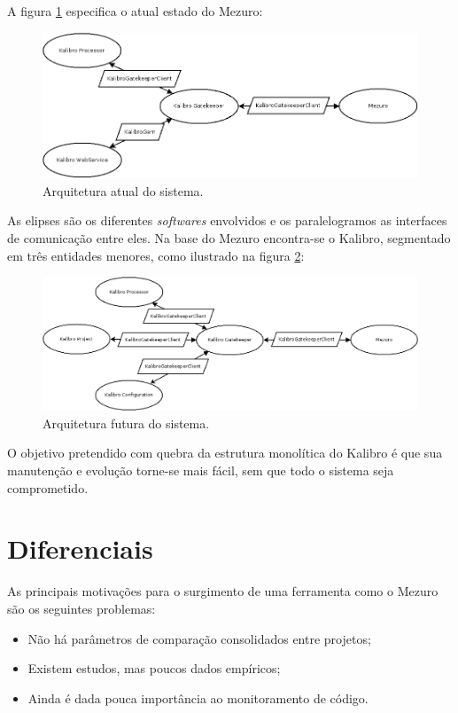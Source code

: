 \documentclass{llncs}
\begin{document}
A figura \ref{fig:architecture-1} especifica o atual estado do Mezuro:
\begin{figure}[H]
  \centering
  \includegraphics[width=\textwidth]{images/mezuro-architecture-actual.png}
  \caption{Arquitetura atual do sistema.}
  \label{fig:architecture-1}
\end{figure}
As elipses são os diferentes \textit{softwares} envolvidos e os paralelogramos as interfaces de comunicação entre eles. Na base do Mezuro encontra-se o Kalibro, segmentado em três entidades menores, como ilustrado na figura \ref{fig:architecture-2}:
\begin{figure}[H]
  \centering
    \includegraphics[width=\textwidth]{images/mezuro-architecture-predicted.png}
  \caption{Arquitetura futura do sistema.}
  \label{fig:architecture-2}
\end{figure}
O objetivo pretendido com quebra da estrutura monolítica do Kalibro é que sua manutenção e evolução torne-se mais fácil, sem que todo o sistema seja comprometido.

\section{Diferenciais} \label{subsec:motivacao}
As principais motivações para o surgimento de uma ferramenta como o Mezuro são os seguintes problemas:
\begin{itemize}
    \item Não há parâmetros de comparação consolidados entre projetos;
    \item Existem estudos, mas poucos dados empíricos;
    \item Ainda é dada pouca importância ao monitoramento de código.
\end{itemize}
\end{document}
